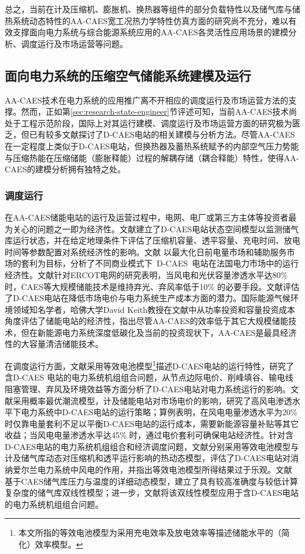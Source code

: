 总之，当前在计及压缩机、膨胀机、换热器等组件的部分负载特性以及储气库与储热系统动态特性的AA-CAES宽工况热力学特性仿真方面的研究尚不充分，难以有效支撑面向电力系统与综合能源系统应用的AA-CAES各灵活性应用场景的建模分析、调度运行及市场运营等问题。

\subsection{面向电力系统的压缩空气储能系统建模及运行}
AA-CAES技术在电力系统的应用推广离不开相应的调度运行及市场运营方法的支撑\cite{CAES-Review-18-Rui-operation}。然而，正如第\ref{sec:research-state-engineer}节评述可知，当前AA-CAES技术尚处于工程示范阶段，国际上对其运行建模、调度运行及市场运营方面的研究极为匮乏，但已有较多文献探讨了D-CAES电站的相关建模与分析方法。尽管AA-CAES在一定程度上类似于D-CAES电站，但换热器及蓄热系统赋予的内部空气压力势能与压缩热能在压缩储能（膨胀释能）过程的解耦存储（耦合释能）特性，使得AA-CAES的建模分析拥有独特之处。

\subsubsection{调度运行}
在AA-CAES储能电站的运行及运营过程中，电网、电厂或第三方主体等投资者最为关心的问题之一即为经济性\cite{CAES-Review-18-Rui-operation}。文献建立了D-CAES电站状态空间模型以监测储气库运行状态，并在给定地理条件下评估了压缩机容量、透平容量、充电时间、放电时间等参数配置对系统经济性的影响。文献 以最大化日前电量市场和辅助服务市场的套利为目标，分析了不同商业模式下~D-CAES~电站在法国电力市场中的运行经济性。文献针对ERCOT电网的研究表明，当风电和光伏容量渗透水平达80\% 时，CAES等大规模储能技术是维持弃光、弃风率低于10\% 的必要手段。文献评估了D-CAES电站在降低市场电价与电力系统生产成本方面的潜力。国际能源气候环境领域知名学者，哈佛大学David Keith教授在文献中从功率投资和容量投资成本角度评估了储能电站的经济性，指出尽管AA-CAES的效率低于其它大规模储能技术，但在新能源电力系统深度低碳化及当前的投资现状下，AA-CAES是最具经济性的大容量清洁储能技术。

在调度运行方面，文献采用等效电池模型\footnote{本文所指的等效电池模型为采用充电效率及放电效率等描述储能水平的（简化）效率模型。}描述D-CAES电站的运行特性，研究了含D-CAES 电站的电力系统机组组合问题，从节点边际电价、削峰填谷、输电线阻塞管理、弃风及环境效益等方面分析了D-CAES电站对电力系统运行的影响。文献采用概率最优潮流模型，计及储能电站对市场电价的影响，研究了高风电渗透水平下电力系统中D-CAES电站的运行策略；算例表明，在风电电量渗透水平为20\%时仅靠电量套利不足以平衡D-CAES电站的运行成本，需要新能源容量补贴等其它收益；当风电电量渗透水平达45\% 时，通过电价套利可确保电站经济性。针对含D-CAES电站的电力系统机组组合和经济调度问题，文献分别采用等效电池模型与计及储气库动态对压缩机和透平运行影响的热动态模型，评估了D-CAES电站对消纳爱尔兰电力系统中风电的作用，并指出等效电池模型所得结果过于乐观。文献~ 基于CAES储气库压力与温度的详细动态模型，建立了具有较高准确度与较低计算复杂度的储气库双线性模型；进一步，文献将该双线性模型应用于含D-CAES电站的电力系统机组组合问题。

